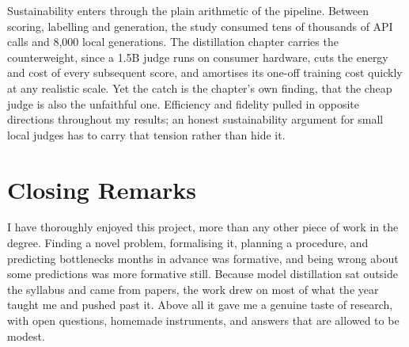 \documentclass[11pt,a4paper]{article}
\begin{document}
Sustainability enters through the plain arithmetic of the pipeline. Between scoring, labelling and generation, the study consumed tens of thousands of API calls and 8,000 local generations. The distillation chapter carries the counterweight, since a 1.5B judge runs on consumer hardware, cuts the energy and cost of every subsequent score, and amortises its one-off training cost quickly at any realistic scale. Yet the catch is the chapter's own finding, that the cheap judge is also the unfaithful one. Efficiency and fidelity pulled in opposite directions throughout my results; an honest sustainability argument for small local judges has to carry that tension rather than hide it.

\section*{Closing Remarks}

I have thoroughly enjoyed this project, more than any other piece of work in the degree. Finding a novel problem, formalising it, planning a procedure, and predicting bottlenecks months in advance was formative, and being wrong about some predictions was more formative still. Because model distillation sat outside the syllabus and came from papers, the work drew on most of what the year taught me and pushed past it. Above all it gave me a genuine taste of research, with open questions, homemade instruments, and answers that are allowed to be modest.
\end{document}
